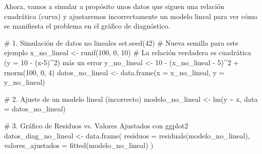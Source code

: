 \documentclass[
  letterpaper,
  DIV=11,
  numbers=noendperiod]{scrreprt}
\newenvironment{Shaded}{\begin{snugshade}}{\end{snugshade}}
\newcommand{\AttributeTok}[1]{\textcolor[rgb]{0.40,0.45,0.13}{#1}}
\newcommand{\CommentTok}[1]{\textcolor[rgb]{0.37,0.37,0.37}{#1}}
\newcommand{\DecValTok}[1]{\textcolor[rgb]{0.68,0.00,0.00}{#1}}
\newcommand{\FunctionTok}[1]{\textcolor[rgb]{0.28,0.35,0.67}{#1}}
\newcommand{\NormalTok}[1]{\textcolor[rgb]{0.00,0.23,0.31}{#1}}
\newcommand{\OtherTok}[1]{\textcolor[rgb]{0.00,0.23,0.31}{#1}}
\newcommand{\SpecialCharTok}[1]{\textcolor[rgb]{0.37,0.37,0.37}{#1}}
\begin{document}
\begin{tcolorbox}[enhanced jigsaw, leftrule=.75mm, breakable, colbacktitle=quarto-callout-tip-color!10!white, bottomrule=.15mm, colframe=quarto-callout-tip-color-frame, toprule=.15mm, colback=white, coltitle=black, bottomtitle=1mm, left=2mm, title=\textcolor{quarto-callout-tip-color}{\faLightbulb}\hspace{0.5em}{Contraejemplo: Violación del supuesto de linealidad}, opacityback=0, arc=.35mm, opacitybacktitle=0.6, toptitle=1mm, titlerule=0mm, rightrule=.15mm]

Ahora, vamos a simular a propósito unos datos que siguen una relación
cuadrática (curva) y ajustaremos incorrectamente un modelo lineal para
ver cómo se manifiesta el problema en el gráfico de diagnóstico.

\begin{Shaded}
\begin{Highlighting}[]
\CommentTok{\# 1. Simulación de datos no lineales}
\FunctionTok{set.seed}\NormalTok{(}\DecValTok{42}\NormalTok{) }\CommentTok{\# Nueva semilla para este ejemplo}
\NormalTok{x\_no\_lineal }\OtherTok{\textless{}{-}} \FunctionTok{runif}\NormalTok{(}\DecValTok{100}\NormalTok{, }\DecValTok{0}\NormalTok{, }\DecValTok{10}\NormalTok{)}
\CommentTok{\# La relación verdadera es cuadrática (y = 10 {-} (x{-}5)\^{}2) más un error}
\NormalTok{y\_no\_lineal }\OtherTok{\textless{}{-}} \DecValTok{10} \SpecialCharTok{{-}}\NormalTok{ (x\_no\_lineal }\SpecialCharTok{{-}} \DecValTok{5}\NormalTok{)}\SpecialCharTok{\^{}}\DecValTok{2} \SpecialCharTok{+} \FunctionTok{rnorm}\NormalTok{(}\DecValTok{100}\NormalTok{, }\DecValTok{0}\NormalTok{, }\DecValTok{4}\NormalTok{)}
\NormalTok{datos\_no\_lineal }\OtherTok{\textless{}{-}} \FunctionTok{data.frame}\NormalTok{(}\AttributeTok{x =}\NormalTok{ x\_no\_lineal, }\AttributeTok{y =}\NormalTok{ y\_no\_lineal)}

\CommentTok{\# 2. Ajuste de un modelo lineal (incorrecto)}
\NormalTok{modelo\_no\_lineal }\OtherTok{\textless{}{-}} \FunctionTok{lm}\NormalTok{(y }\SpecialCharTok{\textasciitilde{}}\NormalTok{ x, }\AttributeTok{data =}\NormalTok{ datos\_no\_lineal)}

\CommentTok{\# 3. Gráfico de Residuos vs. Valores Ajustados con ggplot2}
\NormalTok{datos\_diag\_no\_lineal }\OtherTok{\textless{}{-}} \FunctionTok{data.frame}\NormalTok{(}
  \AttributeTok{residuos =} \FunctionTok{residuals}\NormalTok{(modelo\_no\_lineal),}
  \AttributeTok{valores\_ajustados =} \FunctionTok{fitted}\NormalTok{(modelo\_no\_lineal)}
\NormalTok{)}


\end{Highlighting}
\end{Shaded}
\end{tcolorbox}
\end{document}
